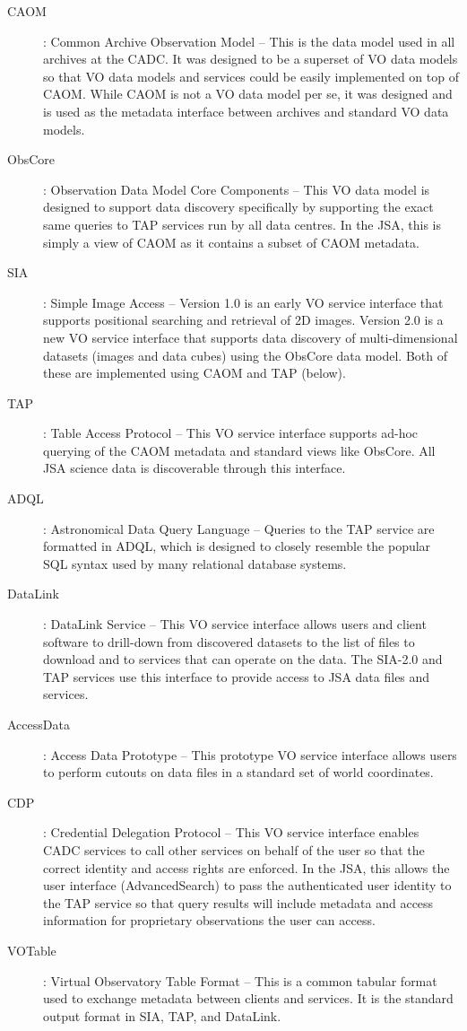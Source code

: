 \documentclass[final,authoryear,5p,times,twocolumn]{elsarticle}
\begin{document}
\begin{description}
\item[CAOM] : Common Archive Observation Model -- This is the data model
used in all archives at the CADC. It was designed to be a superset
of VO data models so that VO data models and services could be easily
implemented on top of CAOM. While CAOM is not a VO data model per se,
it was designed and is used as the metadata interface between archives
and standard VO data models. \citep{2007ASPC..376..347D,2013ASPC..475..159R}
\item[ObsCore] : Observation Data Model Core Components -- This VO data model
is designed to support data discovery specifically by supporting the
exact same queries to TAP services run by all data centres. In the JSA,
this is simply a view of CAOM as it contains a subset of CAOM metadata. \citep{obscore}
\item[SIA] : Simple Image Access -- Version 1.0 is an early VO service
interface that supports positional searching and retrieval of 2D images.
Version 2.0 is a new VO service interface that supports data discovery
of multi-dimensional datasets (images and data cubes) using the ObsCore
data model. Both of these are implemented using CAOM and TAP (below).
\item[TAP] : Table Access Protocol -- This VO service interface supports ad-hoc
querying of the CAOM metadata and standard views like ObsCore. All JSA
science data is discoverable through this interface. \citep{tap}
\item[ADQL] : Astronomical Data Query Language -- Queries to the TAP service
are formatted in ADQL, which is designed to closely resemble the popular SQL
syntax used by many relational database systems. \citep{adql}
\item[DataLink] : DataLink Service -- This VO service interface allows users
and client software to drill-down from discovered datasets to the list
of files to download and to services that can operate on the data. The
SIA-2.0 and TAP services use this interface to provide access to JSA
data files and services. \citep{datalink}
\item[AccessData] : Access Data Prototype -- This prototype VO service interface
allows users to perform cutouts on data files in a standard set of
world coordinates.
\item[CDP] : Credential Delegation Protocol -- This VO service interface enables
CADC services to call other services on behalf of the user so that the
correct identity and access rights are enforced. In the JSA, this allows
the user interface (AdvancedSearch) to pass the authenticated user
identity to the TAP service so that query results will include metadata
and access information for proprietary observations the user can access. \citep{cdp}
\item[VOTable] : Virtual Observatory Table Format -- This is a common tabular
format used to exchange metadata between clients and services. It is
the standard output format in SIA, TAP, and DataLink. \citep{votable}
\end{description}
\end{document}
